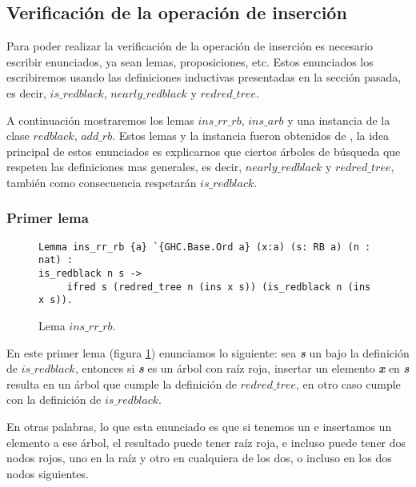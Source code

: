 \subsection{Verificación de la operación de inserción}

Para poder realizar la verificaci\'on de la operaci\'on de inserci\'on es necesario escribir
enunciados, ya sean lemas, proposiciones, etc. Estos enunciados los escribiremos usando las 
definiciones inductivas presentadas en la secci\'on pasada, es decir, 
\hyperref[inductive_isRedB]{$is\_redblack$}, \hyperref[inductive_isRedB]{$nearly\_redblack$} y 
\hyperref[inductive_isRedB]{$redred\_tree$}.

A continuaci\'on mostraremos los lemas \hyperref[lema_1]{$ins\_rr\_rb$}, 
\hyperref[lema_2]{$ins\_arb$} y una instancia \cite{classes} de la clase 
\hyperref[class_rb]{$redblack$}, $add\_rb$. Estos lemas y la instancia fueron obtenidos de 
\cite{MSetRBT}, la idea principal de estos enunciados es explicarnos que ciertos \'arboles de 
b\'usqueda que respeten las definiciones mas generales, es decir, 
\hyperref[inductive_isRedB]{$nearly\_redblack$} y \hyperref[inductive_isRedB]{$redred\_tree$}, 
también como consecuencia respetar\'an \hyperref[inductive_isRedB]{$is\_redblack$}.

\subsubsection{Primer lema}

\begin{figure}[!ht]
\centering
\captionsetup{justification=centering}
\begin{verbatim}
Lemma ins_rr_rb {a} `{GHC.Base.Ord a} (x:a) (s: RB a) (n : nat) :
is_redblack n s ->
     ifred s (redred_tree n (ins x s)) (is_redblack n (ins x s)).
\end{verbatim}
\caption{Lema $ins\_rr\_rb$.}
\label{lema_1}
\end{figure}

En este primer lema (figura \ref{lema_1}) enunciamos lo siguiente: sea \textit{\textbf{s}} un {\arn} 
bajo la definici\'on de \hyperref[inductive_isRedB]{$is\_redblack$}, entonces si \textit{\textbf{s}} 
es un \'arbol con raíz roja, insertar un elemento \textit{\textbf{x}} en \textit{\textbf{s}} resulta 
en un \'arbol que cumple la definici\'on de \hyperref[inductive_isRedB]{$redred\_tree$}, en otro caso 
cumple con la definici\'on de \hyperref[inductive_isRedB]{$is\_redblack$}.

En otras palabras, lo que esta enunciado es que si tenemos un {\arn} e insertamos
un elemento a ese \'arbol, el resultado puede tener ra\'iz roja, e incluso puede tener dos nodos
rojos, uno en la ra\'iz y otro en cualquiera de los dos, o incluso en los dos nodos siguientes.

